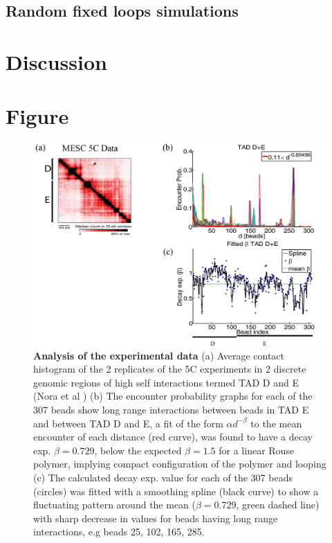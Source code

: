 \documentclass[12pt]{article}
\begin{document}
\subsection{Random fixed loops simulations}\label{subsection_randomFixedLoopsSimulations}

\section{Discussion}\label{section_discussion}

\section{Figure}\label{section_figures}

\begin{figure}[H]
\includegraphics[scale=0.5]{Figure01_AnalysisOfTheExperimentalData}
\caption{\textbf{Analysis of the experimental data} (a) Average contact histogram of the 2 replicates of the 5C experiments in 2 discrete genomic regions of high self interactions termed TAD D and E (Nora et al \cite{Nora2012}) (b) The encounter probability graphs for each of the 307 beads show long range interactions between beads in TAD E and between TAD D and E, a fit of the form $\alpha d ^{-\beta}$ to the mean encounter of each distance (red curve), was found to have a decay exp. $\beta=0.729$, below the expected $\beta=1.5$ for a linear Rouse polymer, implying compact configuration of the polymer and looping (c) The calculated decay exp. value for each of the 307 beads (circles) was fitted with a smoothing spline (black curve) to show a fluctuating pattern around the mean ($\beta=0.729$, green dashed line) with sharp decrease in values for beads having long range interactions, e.g beads 25, 102, 165, 285.}
\label{figure_TADDAndENoraEtAl2012}
\end{figure}
\end{document}
